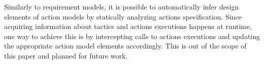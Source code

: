 Similarly to requirement models, it is possible to automatically infer design elements of action models by statically analyzing actions specification.
Since acquiring information about tactics and actions executions happens at runtime, one way to achieve this is by intercepting calls to actions executions and updating the appropriate action model elements accordingly. This is out of the scope of this paper and planned for future work.
 
 






